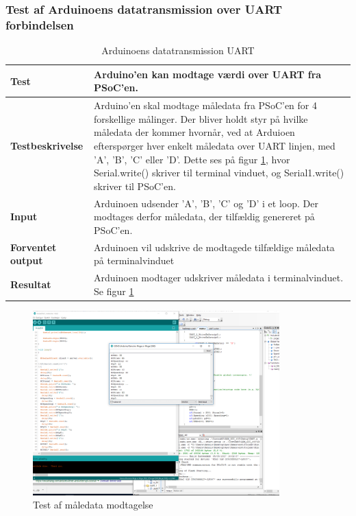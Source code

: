 \subsubsection{Test af Arduinoens datatransmission over UART forbindelsen}

\begin{table}
	\centering
	\begin{tabular}{ | m{} | m{}|} 
		\hline
		\textbf{Test}					&Arduino'en kan modtage værdi over UART fra PSoC'en.   \\ \hline
		\textbf{Testbeskrivelse}		&Arduino'en skal modtage måledata fra PSoC'en for 4 forskellige målinger. Der bliver holdt styr på hvilke måledata der kommer hvornår, ved at Arduioen efterspørger hver enkelt måledata over UART linjen, med 'A', 'B', 'C' eller 'D'. Dette ses på figur \ref{fig:Hentmaaledata}, hvor Serial.write() skriver til terminal vinduet, og Serial1.write() skriver til PSoC'en. \\ \hline
		\textbf{Input}					& Arduinoen udsender 'A', 'B', 'C' og 'D' i et loop. Der modtages derfor måledata, der tilfældig genereret på PSoC'en.  \\ \hline
		\textbf{Forventet output}		&Arduinoen vil udskrive de modtagede tilfældige måledata på terminalvinduet \\ \hline
		\textbf{Resultat}				&Arduinoen modtager udskriver måledata i terminalvinduet. Se figur \ref{fig:Hentmaaledata} \\ \hline
	\end{tabular}
	\caption{Arduinoens datatransmission UART} 
	\label{tab:ArduinoUART}
\end{table}

\begin{figure}[H] %
	\centering
	\includegraphics[width=0.85\textwidth]{Test/ModultestStyringsenhed/EthernettestkontinuertDataflow}
	\caption{Test af måledata modtagelse}
	\label{fig:Hentmaaledata}
\end{figure}